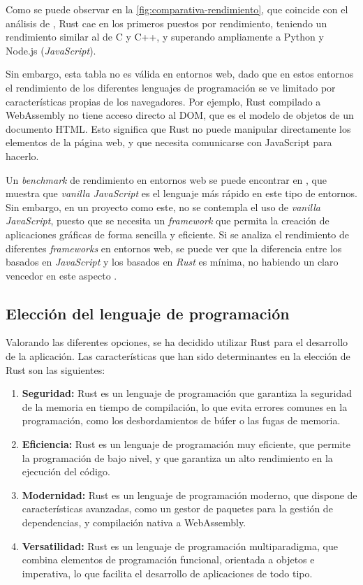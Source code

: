 Como se puede observar en la \autoref{fig:comparativa-rendimiento}, que coincide con el análisis de \autocite{samTop10Fastest2024}, Rust cae en los primeros puestos por rendimiento, teniendo un rendimiento similar al de C y C++, y superando ampliamente a Python y Node.js (\textit{JavaScript}).

Sin embargo, esta tabla no es válida en entornos web, dado que en estos entornos el rendimiento de los diferentes lenguajes de programación se ve limitado por características propias de los navegadores. Por ejemplo, Rust compilado a WebAssembly no tiene acceso directo al \ac{DOM}, que es el modelo de objetos de un documento HTML. Esto significa que Rust no puede manipular directamente los elementos de la página web, y que necesita comunicarse con JavaScript para hacerlo. 

Un \textit{benchmark} de rendimiento en entornos web se puede encontrar en \autocite{InteractiveResults}, que muestra que \textit{vanilla JavaScript} es el lenguaje más rápido en este tipo de entornos. Sin embargo, en un proyecto como este, no se contempla el uso de \textit{vanilla JavaScript}, puesto que se necesita un \textit{framework} que permita la creación de aplicaciones gráficas de forma sencilla y eficiente. Si se analiza el rendimiento de diferentes \textit{frameworks} en entornos web, se puede ver que la diferencia entre los basados en \textit{JavaScript} y los basados en \textit{Rust} es mínima, no habiendo un claro vencedor en este aspecto \autocite{InteractiveResults}.

\subsection{Elección del lenguaje de programación}

Valorando las diferentes opciones, se ha decidido utilizar Rust para el desarrollo de la aplicación. Las características que han sido determinantes en la elección de Rust son las siguientes:

\begin{enumerate}
    \item \textbf{Seguridad:} Rust es un lenguaje de programación que garantiza la seguridad de la memoria en tiempo de compilación, lo que evita errores comunes en la programación, como los desbordamientos de búfer o las fugas de memoria.
    \item \textbf{Eficiencia:} Rust es un lenguaje de programación muy eficiente, que permite la programación de bajo nivel, y que garantiza un alto rendimiento en la ejecución del código.
    \item \textbf{Modernidad:} Rust es un lenguaje de programación moderno, que dispone de características avanzadas, como un gestor de paquetes para la gestión de dependencias, y compilación nativa a WebAssembly.
    \item \textbf{Versatilidad:} Rust es un lenguaje de programación multiparadigma, que combina elementos de programación funcional, orientada a objetos e imperativa, lo que facilita el desarrollo de aplicaciones de todo tipo.
\end{enumerate}

